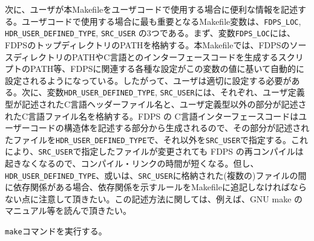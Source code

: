 次に、ユーザが本Makefileをユーザコードで使用する場合に便利な情報を記述する。ユーザコードで使用する場合に最も重要となるMakefile変数は、\texttt{FDPS\_LOC}, \newline \texttt{HDR\_USER\_DEFINED\_TYPE}, \texttt{SRC\_USER} の3つである。まず、変数\texttt{FDPS\_LOC}には、FDPSのトップディレクトリのPATHを格納する。本Makefileでは、FDPSのソースディレクトリのPATHやC言語とのインターフェースコードを生成するスクリプトのPATH等、FDPSに関連する各種な設定がこの変数の値に基いて自動的に設定されるようになっている。したがって、ユーザは適切に設定する必要がある。次に、変数\texttt{HDR\_USER\_DEFINED\_TYPE}, \texttt{SRC\_USER}には、それぞれ、ユーザ定義型が記述されたC言語ヘッダーファイル名と、ユーザ定義型以外の部分が記述されたC言語ファイル名を格納する。FDPS の C言語インターフェースコードはユーザーコードの構造体を記述する部分から生成されるので、その部分が記述されたファイルを\texttt{HDR\_USER\_DEFINED\_TYPE}で、それ以外を\texttt{SRC\_USER}で指定する。これにより、\texttt{SRC\_USER}で指定したファイルが変更されても FDPS の再コンパイルは起きなくなるので、コンパイル・リンクの時間が短くなる。但し、\texttt{HDR\_USER\_DEFINED\_TYPE}、或いは、\texttt{SRC\_USER}に格納された(複数の)ファイルの間に依存関係がある場合、依存関係を示すルールをMakefileに追記しなければならない点に注意して頂きたい。この記述方法に関しては、例えば、GNU make のマニュアル等を読んで頂きたい。
\endifC

\texttt{make}コマンドを実行する。

